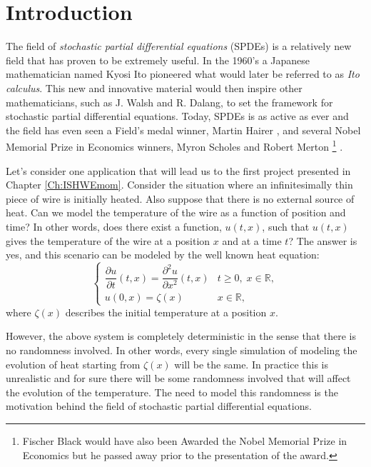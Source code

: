\documentclass[12pt]{report}
\theoremstyle{plain}
\theoremstyle{definition}
\numberwithin{equation}{section}
\newcommand{\R}{\mathbb{R}}
\begin{document}
\normalem       %

 \chapter {Introduction}  %
\vspace{-1cm} %
The field of {\em stochastic partial differential equations} (SPDEs) is a relatively new field that has proven to be extremely useful. In the 1960's a Japanese mathematician named Kyosi Ito pioneered what would later be referred to as {\em Ito calculus}. This new and innovative material would then inspire other mathematicians, such as J. Walsh and R. Dalang, to set the framework for stochastic partial differential equations. Today, SPDEs is as active as ever and the field has even seen a Field's medal winner, Martin Hairer \cite{hairer:13:solving}, and several Nobel Memorial Prize in Economics winners, Myron Scholes and Robert Merton \footnote{Fischer Black would have also been Awarded the Nobel Memorial Prize in Economics but he passed away prior to the presentation of the award.} \cite{black.scholes:73:options}.

Let's consider one application that will lead us to the first project presented in Chapter \ref{Ch:ISHWEmom}. Consider the situation where an infinitesimally thin piece of wire is initially heated. Also suppose that there is no external source of heat. Can we model the temperature of the wire as a function of position and time? In other words, does there exist a function, $u(t,x)$, such that $u(t,x)$ gives the temperature of the wire at a position $x$ and at a time $t$? The answer is yes, and this scenario can be modeled by the well known heat equation: 
\[
\begin{cases}
\dfrac{\partial u}{\partial t}(t,x) = \dfrac{\partial^2 u}{\partial x^2}(t,x) & t \ge 0, \; x \in \R, \\
u(0,x) = \zeta(x) & x \in \R,
\end{cases}
\]
where $\zeta(x)$ describes the initial temperature at a position $x$.

However, the above system is completely deterministic in the sense that there is no randomness involved. In other words, every single simulation of modeling the evolution of heat starting from $\zeta(x)$ will be the same. In practice this is unrealistic and for sure there will be some randomness involved that will affect the evolution of the temperature. The need to model this randomness is the motivation behind the field of stochastic partial differential equations.
\end{document}
